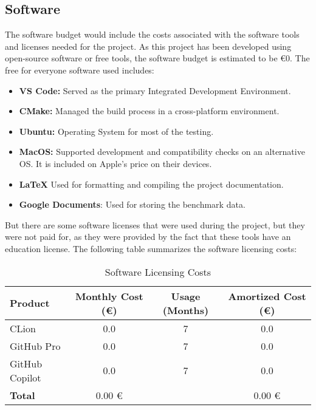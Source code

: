 \subsection{Software}
The software budget would include the costs associated with the software tools and licenses needed for the project. As this project has been developed using open-source software or free tools, the software budget is estimated to be €0. The free for everyone software used includes:
\begin{itemize}
    \item \textbf{VS Code:} Served as the primary Integrated Development Environment.
    \item \textbf{CMake:} Managed the build process in a cross-platform environment.
    \item \textbf{Ubuntu:} Operating System for most of the testing.
    \item \textbf{MacOS:} Supported development and compatibility checks on an alternative OS. It is included on Apple's price on their devices.
    \item \textbf{\LaTeX } Used for formatting and compiling the project documentation.
    \item \textbf{Google Documents}: Used for storing the benchmark data.
\end{itemize}

But there are some software licenses that were used during the project, but they were not paid for, as they were provided by the fact that these tools have an education license. The following table summarizes the software licensing costs:

\begin{table}[h]
  \centering
  \caption{Software Licensing Costs}
  \label{tab:software-licensing-costs}
  \begin{tabular}{|l|c|c|c|}
    \hline
    \textbf{Product}     & \textbf{Monthly Cost (€)} & \textbf{Usage (Months)} & \textbf{Amortized Cost (€)} \\
    \hline
    CLion                & 0.0                       & 7                       & 0.0 \\
    GitHub Pro           & 0.0                       & 7                       & 0.0 \\
    GitHub Copilot       & 0.0                       & 7                       & 0.0 \\
    \hline
    \textbf{Total}       & 0.00 €                    &                         & 0.00 € \\
    \hline
  \end{tabular}
\end{table}


